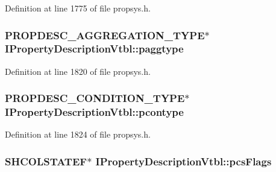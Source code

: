 Definition at line 1775 of file propsys.\+h.

\subsubsection[{\texorpdfstring{paggtype}{paggtype}}]{ {\bf P\+R\+O\+P\+D\+E\+S\+C\+\_\+\+A\+G\+G\+R\+E\+G\+A\+T\+I\+O\+N\+\_\+\+T\+Y\+PE}$\ast$ I\+Property\+Description\+Vtbl\+::paggtype}\hypertarget{struct_i_property_description_vtbl_ab82ac6235e01cf96471cd88abfde9cf2}{}\label{struct_i_property_description_vtbl_ab82ac6235e01cf96471cd88abfde9cf2}


Definition at line 1820 of file propsys.\+h.

\subsubsection[{\texorpdfstring{pcontype}{pcontype}}]{ {\bf P\+R\+O\+P\+D\+E\+S\+C\+\_\+\+C\+O\+N\+D\+I\+T\+I\+O\+N\+\_\+\+T\+Y\+PE}$\ast$ I\+Property\+Description\+Vtbl\+::pcontype}\hypertarget{struct_i_property_description_vtbl_a87de3af571e68378569d03cfdaa891b4}{}\label{struct_i_property_description_vtbl_a87de3af571e68378569d03cfdaa891b4}


Definition at line 1824 of file propsys.\+h.

\subsubsection[{\texorpdfstring{pcs\+Flags}{pcsFlags}}]{ {\bf S\+H\+C\+O\+L\+S\+T\+A\+T\+EF}$\ast$ I\+Property\+Description\+Vtbl\+::pcs\+Flags}\hypertarget{struct_i_property_description_vtbl_ae2254d0cf61356dd1646ab5d5e6ca84b}{}\label{struct_i_property_description_vtbl_ae2254d0cf61356dd1646ab5d5e6ca84b}


